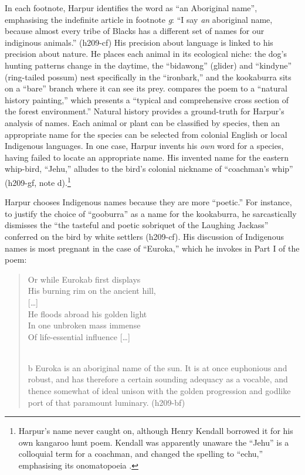 \documentclass[
  Crown,
  times,
  sageh]{sagej}
\begin{document}
In each footnote, Harpur identifies the word as ``an Aboriginal name'',
emphasising the indefinite article in footnote \emph{g}: ``I say
\emph{an} aboriginal name, because almost every tribe of Blacks has a
different set of names for our indiginous animals.'' (h209-cf) His
precision about language is linked to his precision about nature. He
places each animal in its ecological niche: the dog's hunting patterns
change in the daytime, the ``bidawong'' (glider) and ``kindyne''
(ring-tailed possum) nest specifically in the ``ironbark,'' and the
kookaburra sits on a ``bare'' branch where it can see its prey.
\citet[322]{dixon_charles_1980} compares the poem to a ``natural history
painting,'' which presents a ``typical and comprehensive cross section
of the forest environment.'' Natural history provides a ground-truth for
Harpur's analysis of names. Each animal or plant can be classified by
species, then an appropriate name for the species can be selected from
colonial English or local Indigenous languages. In one case, Harpur
invents his \emph{own} word for a species, having failed to locate an
appropriate name. His invented name for the eastern whip-bird, ``Jehu,''
alludes to the bird's colonial nickname of ``coachman's whip'' (h209-gf,
note d).\footnote{Harpur's name never caught on, although Henry Kendall
  borrowed it for his own kangaroo hunt poem. Kendall was apparently
  unaware the ``Jehu'' is a colloquial term for a coachman, and changed
  the spelling to ``echu,'' emphasising its onomatopoeia
  \citep[73]{gelder_colonial_2020}.}

Harpur chooses Indigenous names because they are more ``poetic.'' For
instance, to justify the choice of ``gooburra'' as a name for the
kookaburra, he sarcastically dismisses the ``the tasteful and poetic
sobriquet of the Laughing Jackass'' conferred on the bird by white
settlers (h209-cf). His discussion of Indigenous names is most pregnant
in the case of ``Euroka,'' which he invokes in Part I of the poem:

\begin{quote}
Or while Eurokab first displays\\
His burning rim on the ancient hill,\\
{[}\ldots{]}\\
He floods abroad his golden light\\
In one unbroken mass immense\\
Of life-essential influence {[}\ldots{]}\\
\strut \\
b Euroka is an aboriginal name of the sun. It is at once euphonious and
robust, and has therefore a certain sounding adequacy as a vocable, and
thence somewhat of ideal unison with the golden progression and godlike
port of that paramount luminary. (h209-bf)
\end{quote}
\end{document}
